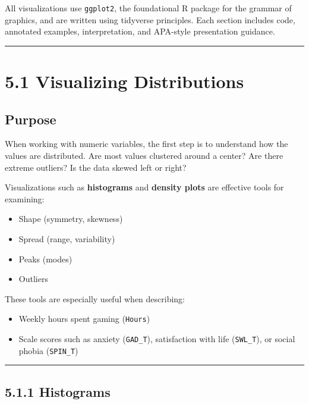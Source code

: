 \documentclass[
]{book}
\providecommand{\tightlist}{%
  \setlength{\itemsep}{0pt}\setlength{\parskip}{0pt}}
\begin{document}
All visualizations use \texttt{ggplot2}, the foundational R package for the grammar of graphics, and are written using tidyverse principles. Each section includes code, annotated examples, interpretation, and APA-style presentation guidance.

\begin{center}\rule{0.5\linewidth}{0.5pt}\end{center}

\section{5.1 Visualizing Distributions}\label{visualizing-distributions}

\subsection{Purpose}\label{purpose}

When working with numeric variables, the first step is to understand how the values are distributed. Are most values clustered around a center? Are there extreme outliers? Is the data skewed left or right?

Visualizations such as \textbf{histograms} and \textbf{density plots} are effective tools for examining:

\begin{itemize}
\tightlist
\item
  Shape (symmetry, skewness)
\item
  Spread (range, variability)
\item
  Peaks (modes)
\item
  Outliers
\end{itemize}

These tools are especially useful when describing:

\begin{itemize}
\tightlist
\item
  Weekly hours spent gaming (\texttt{Hours})
\item
  Scale scores such as anxiety (\texttt{GAD\_T}), satisfaction with life (\texttt{SWL\_T}), or social phobia (\texttt{SPIN\_T})
\end{itemize}

\begin{center}\rule{0.5\linewidth}{0.5pt}\end{center}

\subsection{5.1.1 Histograms}\label{histograms}
\end{document}
